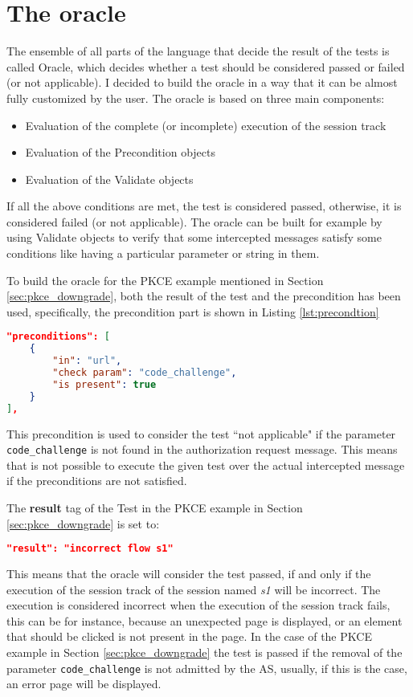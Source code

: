 \section{The oracle}
The ensemble of all parts of the language that decide the result of the tests is called Oracle,
which decides whether a test should be considered passed or failed (or not applicable). I decided to build the oracle in a way that it can be almost fully customized by the user. 
The oracle is based on three main components:
\begin{itemize}
    \item Evaluation of the complete (or incomplete) execution of the \gls{session track} 
    \item Evaluation of the Precondition objects
    \item Evaluation of the Validate objects
\end{itemize}
If all the above conditions are met, the test is considered passed, otherwise, it is considered failed (or not applicable).
The oracle can be built for example by using Validate objects to verify that some intercepted messages satisfy some conditions like having a particular parameter or string in them.

To build the oracle for the \gls{PKCE} example mentioned in Section \ref{sec:pkce_downgrade}, both the result of the test and the precondition has been used, specifically, the precondition part is shown in Listing \ref{lst:precondtion}
\begin{lstlisting}[language=json, caption=Precondition definition, label={lst:precondtion}]
"preconditions": [
    {
        "in": "url",
        "check param": "code_challenge",
        "is present": true
    }
],
\end{lstlisting}
This precondition is used to consider the test ``not applicable" if the parameter \texttt{code\_challenge} is not found in the authorization request message. This means that is not possible to execute the given test over the actual intercepted message if the preconditions are not satisfied.

The \textbf{result} tag of the Test in the \gls{PKCE} example in Section \ref{sec:pkce_downgrade} is set to:
\begin{lstlisting}[language=json]
"result": "incorrect flow s1"
\end{lstlisting}
This means that the oracle will consider the test passed, if and only if the execution of the \gls{session track} of the session named \textit{s1} will be incorrect. The execution is considered incorrect when the execution of the \gls{session track} fails, this can be for instance, because an unexpected page is displayed, or an element that should be clicked is not present in the page. In the case of the PKCE example in Section \ref{sec:pkce_downgrade} the test is passed if the removal of the parameter \texttt{code\_challenge} is not admitted by the AS, usually, if this is the case, an error page will be displayed.

